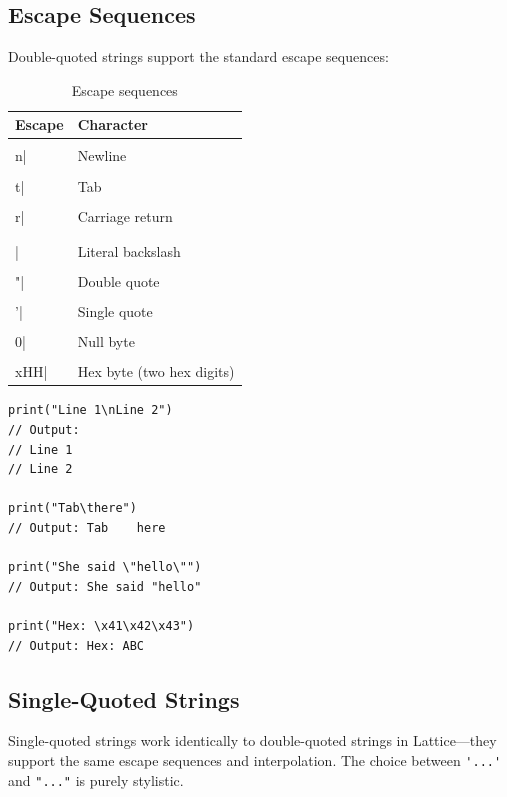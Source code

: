 \subsection{Escape Sequences}\label{sec:escape-sequences}

Double-quoted strings support the standard escape sequences:

\begin{table}[ht]
\centering
\begin{tabular}{ll}
\toprule
\textbf{Escape} & \textbf{Character} \\
\midrule
\lstinline|\\n| & Newline \\
\lstinline|\\t| & Tab \\
\lstinline|\\r| & Carriage return \\
\lstinline|\\\\| & Literal backslash \\
\lstinline|\\"| & Double quote \\
\lstinline|\\'| & Single quote \\
\lstinline|\\0| & Null byte \\
\lstinline|\\xHH| & Hex byte (two hex digits) \\
\bottomrule
\end{tabular}
\caption{Escape sequences}\label{tab:escape-sequences}
\end{table}

\begin{lstlisting}[language=Lattice, caption={Using escape sequences}]
print("Line 1\nLine 2")
// Output:
// Line 1
// Line 2

print("Tab\there")
// Output: Tab    here

print("She said \"hello\"")
// Output: She said "hello"

print("Hex: \x41\x42\x43")
// Output: Hex: ABC
\end{lstlisting}

\subsection{Single-Quoted Strings}\label{sec:single-quoted}

Single-quoted strings work identically to double-quoted strings in Lattice---they support the same escape sequences and interpolation. The choice between \lstinline|'...'| and \lstinline|"..."| is purely stylistic.

